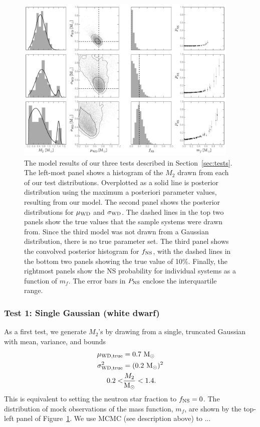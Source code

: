 \documentclass[letterpaper,12pt,preprint]{aastex}
\newcommand{\Msun}{\ifmmode {{\rm M}_{\odot}}\else M$_{\odot}$\fi}
\begin{document}
\begin{figure}[h!]
\begin{center}
\includegraphics[width=0.95\textwidth]{many-panel.pdf}
\caption{The model results of our three tests described in Section~\ref{sec:tests}. The left-most panel shows a histogram of the $M_2$ drawn from each of our test distributions. Overplotted as a solid line is posterior distribution using the maximum a posteriori parameter values, resulting from our model. The second panel shows the posterior distributions for $\mu_{\rm WD}$ and $\sigma_{\rm WD}$. The dashed lines in the top two panels show the true values that the sample systems were drawn from. Since the third model was not drawn from a Gaussian distribution, there is no true parameter set. The third panel shows the convolved posterior histogram for $f_{\rm NS}$, with the dashed lines in the bottom two panels showing the true value of 10\%. Finally, the rightmost panels show the NS probability for individual systems as a function of $m_f$. The error bars in $P_{\rm NS}$ enclose the interquartile range.}
\label{fig:tests}
\end{center}
\end{figure}


\subsubsection{Test 1: Single Gaussian (white dwarf)} \label{sec:exp1}

As a first test, we generate $M_2$'s by drawing from a single, truncated Gaussian with mean, variance, and bounds
\begin{align}
	\mu_{\rm WD, true} &= 0.7~\Msun\\
	\sigma^2_{\rm WD, true} &= (0.2~\Msun)^2\\
	0.2 < &\frac{M_2}{\Msun} < 1.4.
\end{align}
This is equivalent to setting the neutron star fraction to $f_{\rm NS} = 0$. The distribution of mock observations of the mass function, $m_f$, are shown by the top-left panel of Figure~\ref{fig:tests}. We use MCMC (see description above) to ... 
\end{document}
